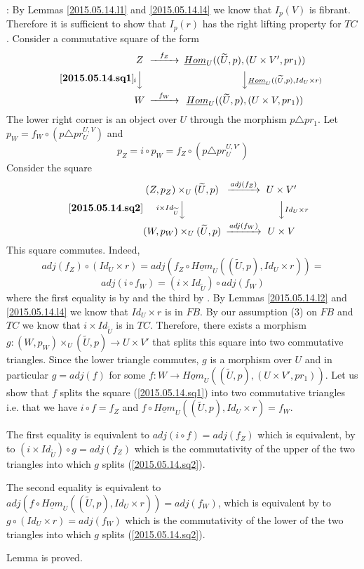 \documentclass[12pt]{article}
\newenvironment{eq}{\begin{equation}}{\end{equation}}
\newenvironment{myproof}{{\bf Proof}:}{\vskip 5mm }
\newcommand{\llabel}[1]{\label{#1}[{\bf #1}]}
\newcommand{\sr}{\rightarrow}
\newcommand{\uu}{\underline}
\newcommand{\wt}{\widetilde}
\begin{document}
\begin{myproof}
By Lemmas \ref{2015.05.14.l1} and \ref{2015.05.14.l4} we know that $I_p(V)$ is fibrant. Therefore it is sufficient to show that $I_p(r)$ has the right lifting property for $TC$. Consider a commutative square of the form 
%
\begin{eq}
\llabel{2015.05.14.sq1}
\begin{CD}
Z @>f_Z>> \uu{Hom}_U((\wt{U},p),(U\times V',pr_1))\\
@V i VV @VV \uu{Hom}_U((\wt{U},p), Id_U\times r) V\\
W @>f_W >> \uu{Hom}_U((\wt{U},p), (U\times V, pr_1))
\end{CD}
\end{eq}
%
The lower right corner is an object over $U$ through the morphism $p\triangle pr_1$. Let $p_W=f_W\circ (p\triangle pr^{U,V}_U)$ and 
%
$$p_Z=i\circ p_W=f_Z\circ (p\triangle pr^{U,V'}_U)$$
%
Consider the square
%
\begin{eq}
\llabel{2015.05.14.sq2}
\begin{CD}
(Z,p_Z)\times_U (\wt{U},p) @>adj(f_Z)>> U\times V'\\
@Vi\times Id_{\wt{U}} VV @VV Id_U\times r V\\
(W,p_W)\times_U (\wt{U},p) @>adj(f_W)>> U\times V
\end{CD}
\end{eq}
%
This square commutes. Indeed,
%
$$adj(f_Z)\circ (Id_U\times r )=adj(f_Z\circ \uu{Hom}_U((\wt{U},p), Id_U\times r))=$$
$$adj(i\circ f_W)=(i\times Id_{\wt{U}})\circ adj (f_W)$$
%
where the first equality is by \cite[Lemma 8.7(1)]{fromunivwithPi} and the third by \cite[Lemma 8.7(3)]{fromunivwithPi}. By Lemmas \ref{2015.05.14.l2} and \ref{2015.05.14.l4} we know that $Id_U\times r$ is in $FB$. By our assumption (3) on $FB$ and $TC$ we know that $i\times Id_{\wt{U}}$ is in $TC$. Therefore, there exists a morphism $g:(W,p_W)\times_U (\wt{U},p) \sr U\times V'$ that splits this square into two commutative triangles. Since the lower triangle commutes, $g$ is a morphism over $U$ and in particular $g=adj(f)$ for some $f:W\sr \uu{Hom}_U((\wt{U},p),(U\times V',pr_1))$. Let us show that $f$ splits the square (\ref{2015.05.14.sq1}) into two commutative triangles i.e. that we have $i\circ f= f_Z$ and $f\circ \uu{Hom}_U((\wt{U},p), Id_U\times r)=f_W$. 

The first equality is equivalent to $adj(i\circ f)=adj(f_Z)$ which is equivalent, by \cite[Lemma 8.7(3)]{fromunivwithPi} to $(i\times Id_{\wt{U}})\circ g=adj(f_Z)$ which is the commutativity of the upper of the two triangles into which $g$ splits (\ref{2015.05.14.sq2}). 

The second equality is equivalent to $adj(f\circ \uu{Hom}_U((\wt{U},p), Id_U\times r))=adj(f_W)$, which is equivalent by \cite[Lemma 8.7(1)]{fromunivwithPi} to 
$g\circ (Id_U\times r)=adj(f_W)$ which is the commutativity of the lower of the two triangles into which $g$ splits (\ref{2015.05.14.sq2}). 

Lemma is proved.
\end{myproof}
\end{document}
